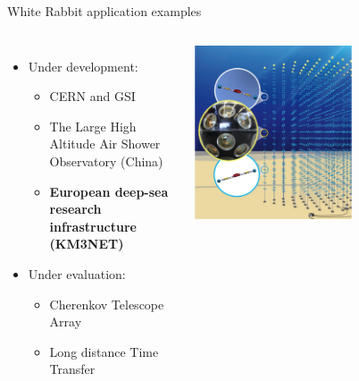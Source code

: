 \documentclass[compress, red]{beamer}
\begin{document}
\begin{frame}{White Rabbit application examples}
\begin{columns}[c]
    \begin{itemize}
      \item Under development:
      \begin{itemize}
	\item CERN and GSI
	\item The Large High Altitude Air Shower Observatory (China)
	\item \textbf{European deep-sea research infrastructure (KM3NET)} 
      \end{itemize}         	
      \item Under evaluation:
      \begin{itemize}
	\item Cherenkov Telescope Array
	\item Long distance Time Transfer
      \end{itemize}         	
    \end{itemize}    
    \begin{center}
      \includegraphics[width=0.6\textwidth]{applications/KM3NeT.pdf}
      \end{center}
\end{columns}
\end{frame}
\end{document}
